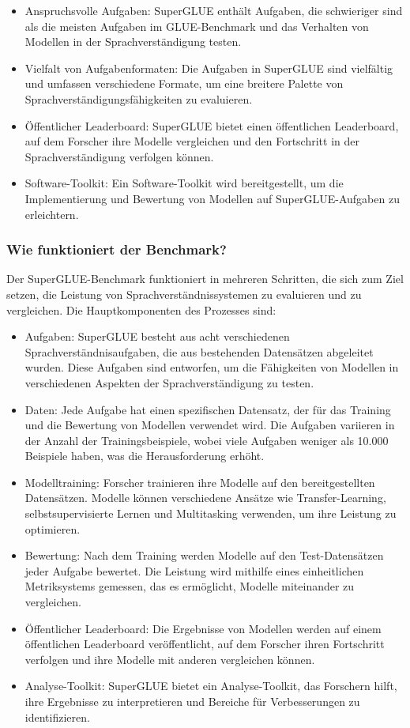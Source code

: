 \begin{itemize}
\item Anspruchsvolle Aufgaben: SuperGLUE enthält Aufgaben, die schwieriger sind als die meisten Aufgaben im GLUE-Benchmark und das Verhalten von Modellen in der Sprachverständigung testen.
\item Vielfalt von Aufgabenformaten: Die Aufgaben in SuperGLUE sind vielfältig und umfassen verschiedene Formate, um eine breitere Palette von Sprachverständigungsfähigkeiten zu evaluieren.
\item Öffentlicher Leaderboard: SuperGLUE bietet einen öffentlichen Leaderboard, auf dem Forscher ihre Modelle vergleichen und den Fortschritt in der Sprachverständigung verfolgen können.
\item Software-Toolkit: Ein Software-Toolkit wird bereitgestellt, um die Implementierung und Bewertung von Modellen auf SuperGLUE-Aufgaben zu erleichtern.
\end{itemize}

\subsubsection*{Wie funktioniert der Benchmark?}

Der SuperGLUE-Benchmark funktioniert in mehreren Schritten, die sich zum Ziel setzen, die Leistung von Sprachverständnissystemen zu evaluieren und zu vergleichen. Die Hauptkomponenten des Prozesses sind:

\begin{itemize}
\item Aufgaben: SuperGLUE besteht aus acht verschiedenen Sprachverständnisaufgaben, die aus bestehenden Datensätzen abgeleitet wurden. Diese Aufgaben sind entworfen, um die Fähigkeiten von Modellen in verschiedenen Aspekten der Sprachverständigung zu testen.
\item Daten: Jede Aufgabe hat einen spezifischen Datensatz, der für das Training und die Bewertung von Modellen verwendet wird. Die Aufgaben variieren in der Anzahl der Trainingsbeispiele, wobei viele Aufgaben weniger als 10.000 Beispiele haben, was die Herausforderung erhöht.
\item Modelltraining: Forscher trainieren ihre Modelle auf den bereitgestellten Datensätzen. Modelle können verschiedene Ansätze wie Transfer-Learning, selbstsupervisierte Lernen und Multitasking verwenden, um ihre Leistung zu optimieren.
\item Bewertung: Nach dem Training werden Modelle auf den Test-Datensätzen jeder Aufgabe bewertet. Die Leistung wird mithilfe eines einheitlichen Metriksystems gemessen, das es ermöglicht, Modelle miteinander zu vergleichen.
\item Öffentlicher Leaderboard: Die Ergebnisse von Modellen werden auf einem öffentlichen Leaderboard veröffentlicht, auf dem Forscher ihren Fortschritt verfolgen und ihre Modelle mit anderen vergleichen können.
\item Analyse-Toolkit: SuperGLUE bietet ein Analyse-Toolkit, das Forschern hilft, ihre Ergebnisse zu interpretieren und Bereiche für Verbesserungen zu identifizieren.
\end{itemize}


